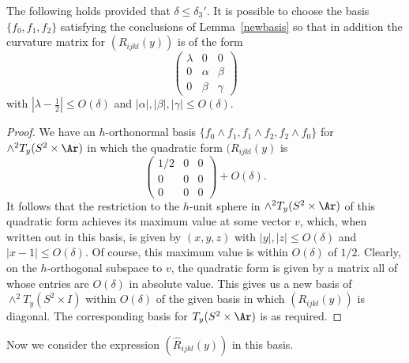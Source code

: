 \begin{corollary}
\label{cor:curvature-diagonal-block-basis}
\label{2ndnewbasis}
The following holds provided that $\delta\le \delta_3'$. It is
possible to choose the basis $\{f_0,f_1,f_2\}$ satisfying the
conclusions of Lemma~\ref{newbasis} so that in addition the
curvature matrix for $(R_{ijkl}(y))$ is of the form
$$\begin{pmatrix} \lambda & 0 & 0 \\ 0 & \alpha & \beta \\ 0 & \beta & \gamma\end{pmatrix}$$
with $|\lambda-\frac{1}{2}|\le O(\delta)$ and
$|\alpha|,|\beta|,|\gamma|\le O(\delta)$.
\end{corollary}


\begin{proof}
We have an $h$-orthonormal basis $\{f_0\wedge f_1,f_1\wedge
f_2,f_2\wedge f_0\}$ for $\wedge^2T_y(S^2\times \Ar)$ in which the
quadratic form $(R_{ijkl}(y)$ is
$$\begin{pmatrix} 1/2 & 0 & 0 \\ 0 & 0 & 0 \\ 0 & 0 & 0\end{pmatrix}
+O(\delta).$$ It follows that the restriction to the $h$-unit sphere
in $\wedge^2T_y(S^2\times \Ar)$ of this quadratic form achieves its
maximum value at some vector $v$, which, when written out in this
basis, is given by $(x,y,z)$ with $|y|,|z|\le O(\delta)$ and
$|x-1|\le O(\delta)$. Of course, this maximum value is within
$O(\delta)$ of $1/2$. Clearly, on the $h$-orthogonal subspace to
$v$, the quadratic form is given by a matrix all of whose entries
are $O(\delta)$ in absolute value. This gives us a new basis of
$\wedge^2T_y(S^2\times I)$ within $O(\delta)$ of the given basis in
which $(R_{ijkl}(y))$ is diagonal. The corresponding basis for
$T_y(S^2\times\Ar)$ is as required.
\end{proof}

Now we consider the expression  $(\hat R_{ijkl}(y))$ in this basis.

